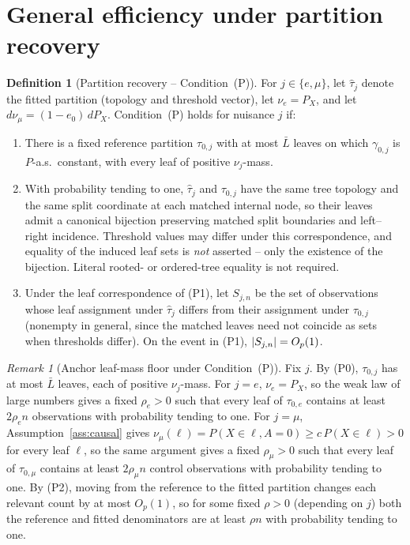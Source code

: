 \documentclass[11pt]{article}
\theoremstyle{plain}
\theoremstyle{definition}
\newtheorem{definition}[theorem]{Definition}
\theoremstyle{remark}
\newtheorem{remark}[theorem]{Remark}
\newcommand{\ez}{e_0}
\DeclarePairedDelimiter{\card}{\lvert}{\rvert}
\begin{document}
\section{General efficiency under partition recovery}\label{sec:condP}

\begin{definition}[Partition recovery -- Condition~(P)]
\label{cond:P}
For $j\in\{e,\mu\}$, let $\hat\tau_j$ denote the fitted partition (topology
and threshold vector), let $\nu_e=P_X$, and let $d\nu_\mu=(1-\ez)\,dP_X$.
Condition~(P) holds for nuisance $j$ if:
\begin{enumerate}[label=(P\arabic*),leftmargin=*]
  \item[(P0)] There is a fixed reference partition $\tau_{0,j}$ with at most
  $\bar L$ leaves on which $\gamma_{0,j}$ is $P$-a.s.\ constant, with every
  leaf of positive $\nu_j$-mass.

  \item[(P1)] With probability tending to one, $\hat\tau_j$ and $\tau_{0,j}$
  have the same tree topology and the same split coordinate at each matched
  internal node, so their leaves admit a canonical bijection preserving
  matched split boundaries and left--right incidence. Threshold values may
  differ under this correspondence, and equality of the induced leaf sets is
  \emph{not} asserted -- only the existence of the bijection. Literal rooted-
  or ordered-tree equality is not required.

  \item[(P2)] Under the leaf correspondence of (P1), let $S_{j,n}$ be the set
  of observations whose leaf assignment under $\hat\tau_j$ differs from
  their assignment under $\tau_{0,j}$ (nonempty in general, since the
  matched leaves need not coincide as sets when thresholds differ). On the
  event in (P1), $\card{S_{j,n}}=O_p(1)$.
\end{enumerate}
\end{definition}

\begin{remark}[Anchor leaf-mass floor under Condition~(P)]
\label{rem:P-anchor-mass}
Fix $j$. By (P0), $\tau_{0,j}$ has at most $\bar L$ leaves, each of positive
$\nu_j$-mass. For $j=e$, $\nu_e=P_X$, so the weak law of large numbers gives
a fixed $\rho_e>0$ such that every leaf of $\tau_{0,e}$ contains at least
$2\rho_en$ observations with probability tending to one. For $j=\mu$,
Assumption~\ref{ass:causal} gives $\nu_\mu(\ell)=P(X\in\ell,A=0)\ge
c\,P(X\in\ell)>0$ for every leaf $\ell$, so the same argument gives a fixed
$\rho_\mu>0$ such that every leaf of $\tau_{0,\mu}$ contains at least
$2\rho_\mu n$ control observations with probability tending to one. By (P2),
moving from the reference to the fitted partition changes each relevant
count by at most $O_p(1)$, so for some fixed $\rho>0$ (depending on $j$) both
the reference and fitted denominators are at least $\rho n$ with probability
tending to one.
\end{remark}
\end{document}
